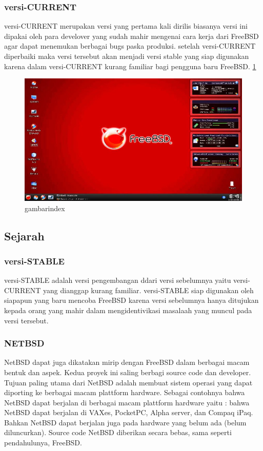 \subsubsection{versi-CURRENT}
	versi-CURRENT merupakan versi yang pertama kali dirilis biasanya versi ini dipakai oleh para develover yang sudah mahir mengenai
	cara kerja dari FreeBSD agar dapat menemukan berbagai bugs paska produksi. setelah versi-CURRENT diperbaiki maka versi tersebut
	akan menjadi versi stable yang siap digunakan karena dalam versi-CURRENT kurang familiar bagi pengguna baru FreeBSD.
	\ref{freebsd} 
	\begin{figure} [ht]
	\centerline{\includegraphics[width=1\textwidth]{figures/freebsd.jpg}}
	\caption{gambarindex}
	\label {freebsd}
	\end {figure}
\subsection{Sejarah}
\subsubsection{versi-STABLE}
	versi-STABLE adalah versi pengembangan ddari versi sebelumnya yaitu versi-CURRENT yang dianggap kurang familiar.
	versi-STABLE siap digunakan oleh siapapun yang baru mencoba FreeBSD karena versi sebelumnya hanya ditujukan kepada
	orang yang mahir dalam mengidentivikasi masalaah yang muncul pada versi tersebut.
\subsubsection{NETBSD}
	NetBSD dapat juga dikatakan mirip dengan FreeBSD dalam berbagai macam bentuk dan aspek. Kedua proyek ini saling berbagi source code dan developer. 
	Tujuan paling utama dari NetBSD adalah membuat sistem operasi yang dapat diporting ke berbagai macam plattform hardware. 
	Sebagai contohnya bahwa NetBSD dapat berjalan di berbagai macam plattform hardware yaitu : bahwa NetBSD dapat berjalan di VAXes, PocketPC, Alpha server, dan Compaq iPaq. Bahkan NetBSD dapat berjalan juga pada hardware yang belum ada (belum diluncurkan). 
	Source code NetBSD diberikan secara bebas, sama seperti pendahulunya, FreeBSD.
